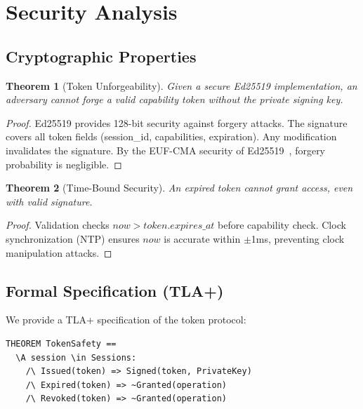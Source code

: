 \documentclass[11pt,a4paper]{article}
\newtheorem{theorem}{Theorem}
\begin{document}
\section{Security Analysis}
\label{sec:security}

\subsection{Cryptographic Properties}

\begin{theorem}[Token Unforgeability]
Given a secure Ed25519 implementation, an adversary cannot forge a valid capability token without the private signing key.
\end{theorem}

\begin{proof}
Ed25519 provides 128-bit security against forgery attacks. The signature covers all token fields (session\_id, capabilities, expiration). Any modification invalidates the signature. By the EUF-CMA security of Ed25519~\cite{Bernstein2012}, forgery probability is negligible.
\end{proof}

\begin{theorem}[Time-Bound Security]
An expired token cannot grant access, even with valid signature.
\end{theorem}

\begin{proof}
Validation checks $now > token.expires\_at$ before capability check. Clock synchronization (NTP) ensures $now$ is accurate within $\pm$1ms, preventing clock manipulation attacks.
\end{proof}

\subsection{Formal Specification (TLA+)}

We provide a TLA+ specification of the token protocol:

\begin{lstlisting}[caption=TLA+ token safety property]
THEOREM TokenSafety ==
  \A session \in Sessions:
    /\ Issued(token) => Signed(token, PrivateKey)
    /\ Expired(token) => ~Granted(operation)
    /\ Revoked(token) => ~Granted(operation)
\end{lstlisting}
\end{document}
